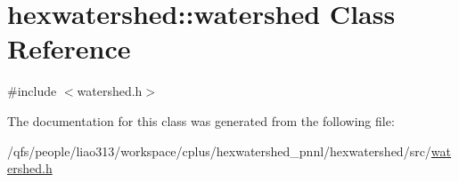 \hypertarget{classhexwatershed_1_1watershed}{\section{hexwatershed\-:\-:watershed Class Reference}
\label{classhexwatershed_1_1watershed}
}


{\ttfamily \#include $<$watershed.\-h$>$}



The documentation for this class was generated from the following file\-:\begin{DoxyCompactItemize}
\item 
/qfs/people/liao313/workspace/cplus/hexwatershed\-\_\-pnnl/hexwatershed/src/\hyperlink{watershed_8h}{watershed.\-h}\end{DoxyCompactItemize}
